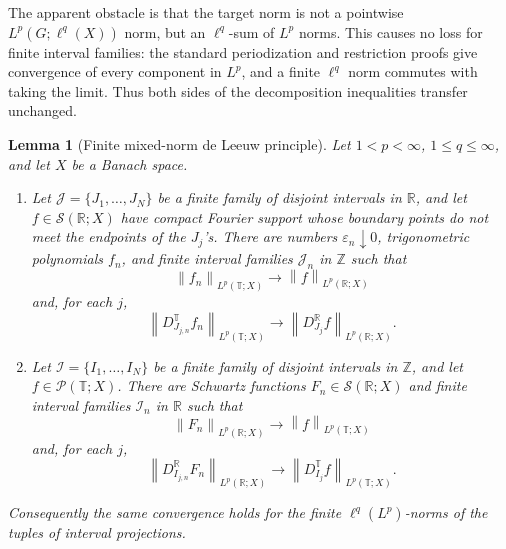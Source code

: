 \documentclass[11pt]{article}
\newtheorem{lemma}{Lemma}
\newcommand{\T}{\mathbb T}
\newcommand{\R}{\mathbb R}
\newcommand{\Z}{\mathbb Z}
\newcommand{\cP}{\mathcal P}
\newcommand{\cS}{\mathcal S}
\newcommand{\norm}[1]{\left\lVert #1 \right\rVert}
\begin{document}
The apparent obstacle is that the target norm is not a pointwise
\(L^p(G;\ell^q(X))\) norm, but an \(\ell^q\)-sum of \(L^p\) norms.  This causes
no loss for finite interval families: the standard periodization and
restriction proofs give convergence of every component in \(L^p\), and a
finite \(\ell^q\) norm commutes with taking the limit.  Thus both sides of the
decomposition inequalities transfer unchanged.

\begin{lemma}[Finite mixed-norm de Leeuw principle]\label{lem:deleeuw}
Let \(1<p<\infty\), \(1\le q\le\infty\), and let \(X\) be a Banach space.

\begin{enumerate}
\item Let \(\mathcal J=\{J_1,\ldots,J_N\}\) be a finite family of disjoint
intervals in \(\R\), and let \(f\in \cS(\R;X)\) have compact Fourier support
whose boundary points do not meet the endpoints of the \(J_j\)'s.  There are
numbers \(\varepsilon_n\downarrow0\), trigonometric polynomials \(f_n\), and
finite interval families \(\mathcal J_n\) in \(\Z\) such that
\[
  \norm{f_n}_{L^p(\T;X)}\to\norm{f}_{L^p(\R;X)}
\]
and, for each \(j\),
\[
  \norm{D_{J_{j,n}}^\T f_n}_{L^p(\T;X)}
  \to
  \norm{D_{J_j}^\R f}_{L^p(\R;X)}.
\]

\item Let \(\mathcal I=\{I_1,\ldots,I_N\}\) be a finite family of disjoint
intervals in \(\Z\), and let \(f\in\cP(\T;X)\).  There are Schwartz functions
\(F_n\in \cS(\R;X)\) and finite interval families \(\mathcal I_n\) in \(\R\)
such that
\[
  \norm{F_n}_{L^p(\R;X)}\to\norm{f}_{L^p(\T;X)}
\]
and, for each \(j\),
\[
  \norm{D_{I_{j,n}}^\R F_n}_{L^p(\R;X)}
  \to
  \norm{D_{I_j}^\T f}_{L^p(\T;X)}.
\]
\end{enumerate}
Consequently the same convergence holds for the finite
\(\ell^q(L^p)\)-norms of the tuples of interval projections.
\end{lemma}
\end{document}

